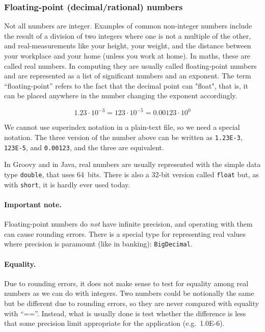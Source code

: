 \subsubsection{Floating-point (decimal/rational) numbers}
\label{sec:float-point-decim}

Not all numbers are integer. Examples of common non-integer numbers
include the result of a division of two integers where one is not a
multiple of the other, and real-measurements like your height, your
weight, and the distance between your workplace and your home (unless
you work at home). In maths, these are called real numbers. In
computing they are usually called floating-point numbers and are
represented as a list of significant numbers and an exponent. The term
``floating-point'' refers to the fact that the decimal point can "float",
that is, it can be placed anywhere in the number changing the exponent
accordingly. 

$$ 1.23 \cdot 10^{-3} = 123 \cdot 10^{-5} = 0.00123 \cdot 10^0 $$

We cannot use superindex notation in a plain-text file, so we need a
special notation. The three version of the number above can be written
as \verb+1.23E-3+, \verb+123E-5+, and \verb+0.00123+, and the three are
equivalent. 

In Groovy and in Java, real numbers are usually represented with the
simple data type \verb+double+, that uses 64~bits. There is also a
32-bit version called \verb+float+ but, as with \verb+short+, it is
hardly ever used today.

\paragraph{Important note.} 

Floating-point numbers do \emph{not} have infinite precision, and
operating with them can cause rounding errors. There is a special type
for representing real values where precision is paramount (like in
banking): \verb+BigDecimal+. 

\paragraph{Equality. }

Due to rounding errors, it does not make sense to test for equality
among real numbers as we can do with integers. Two numbers could be
notionally the same but be different due to rounding errors, so they
are never compared with equality with ``==''. Instead, what is
usually done is test whether the difference is less that some
precision limit appropriate for the application (e.g.~1.0E-6). 

